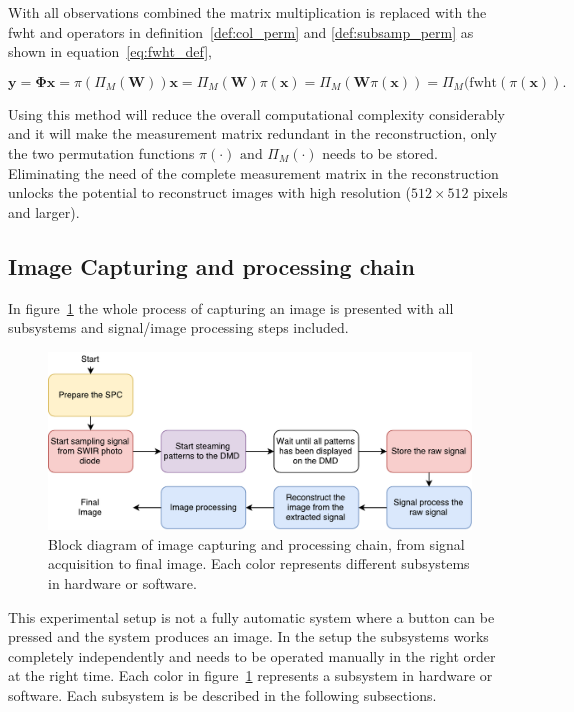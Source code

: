With all observations combined the matrix multiplication is replaced with the fwht and operators in definition~\ref{def:col_perm} and \ref{def:subsamp_perm} as shown in equation~\ref{eq:fwht_def},

\begin{equation}
\mathbf{y} = \mathbf{\Phi}\mathbf{x} = \pi(\Pi_M(\mathbf{W}))\mathbf{x} = \Pi_M(\mathbf{W})\pi(\mathbf{x}) = \Pi_M(\mathbf{W}\pi(\mathbf{x})) = \Pi_M(\text{fwht}(\pi(\mathbf{x}))\text{.}
\label{eq:fwht_def}
\end{equation}

Using this method will reduce the overall computational complexity considerably and it will make the measurement matrix redundant in the reconstruction, only the two permutation functions $\pi(\cdot) \text{ and } \Pi_M(\cdot)$ needs to be stored. Eliminating the need of the complete measurement matrix in the reconstruction unlocks the potential to reconstruct images with high resolution ($512\times512$ pixels and larger). \cite{article:SRM_long, article:TVAL3}



\subsection{Image Capturing and processing chain}
In figure~\ref{fig:flow_chart} the whole process of capturing an image is presented with all subsystems and signal/image processing steps included.

\begin{figure}[H]
\includegraphics[width = 1\linewidth]{gfx/flowchart3.pdf}
\caption{Block diagram of image capturing and processing chain, from signal acquisition to final image. Each color represents different subsystems in hardware or software.}
	\label{fig:flow_chart}
\end{figure}

This experimental setup is not a fully automatic system where a button can be pressed and the system produces an image. In the setup the subsystems works completely independently and needs to be operated manually in the right order at the right time. Each color in figure~\ref{fig:flow_chart} represents a subsystem in hardware or software. Each subsystem is be described in the following subsections.


